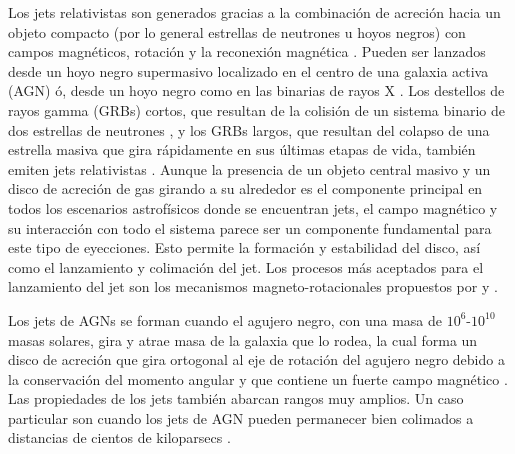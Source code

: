 \documentclass[12pt,a4paper]{book}
\begin{document}
Los jets relativistas son generados gracias a la combinación de acreción hacia un objeto compacto (por lo general estrellas de neutrones u hoyos negros) con campos magnéticos, rotación y la reconexión magnética . Pueden ser lanzados desde un hoyo negro supermasivo localizado en el 
centro de una galaxia activa (AGN) \citep{2019ARA&A..57..467B} ó, desde un hoyo negro como en las binarias de rayos X \citep{2020ApJ...895L..31E}. Los destellos de rayos gamma (GRBs) cortos, que resultan de la colisión 
de un sistema binario de dos estrellas de neutrones \citep{2021MNRAS.506.3483P}, y los GRBs largos, que resultan del colapso de una estrella masiva que gira rápidamente en sus últimas etapas de 
vida, también emiten jets relativistas \citep{2022MNRAS.509.5964S}.
Aunque la presencia de un objeto central masivo y un disco de acreción de gas girando a su alrededor es el componente principal en todos los escenarios astrofísicos donde se encuentran jets, el campo magnético y su 
interacción con todo el sistema parece ser un componente fundamental para este tipo de eyecciones. Esto permite la formación y estabilidad del disco, así como el lanzamiento y colimación del jet. Los procesos más 
aceptados para el lanzamiento del jet son los mecanismos magneto-rotacionales propuestos por \citet{1977MNRAS.179..433B} y \citet{1982MNRAS.199..883B}.


Los jets de AGNs se forman cuando el agujero negro, con una masa de $10^6$-$10^{10}$ masas solares, gira y atrae masa de la galaxia que lo rodea, la cual forma un disco de acreción
que gira ortogonal al eje de rotación del agujero negro debido a la conservación del momento angular y que contiene un fuerte campo magnético \citep{2008ICRC....5.1405H}. %
Las propiedades de los jets también abarcan rangos muy amplios. Un caso particular son cuando los jets de AGN pueden permanecer bien colimados a distancias de cientos de kiloparsecs \citep{2021Romero}. %
\end{document}

